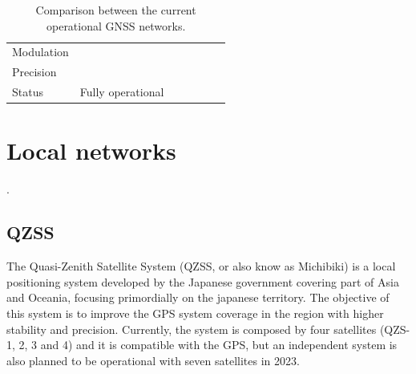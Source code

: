 \begin{table}[!h]
\begin{tabular}{lcccccc}
        Modulation                       &                   &                              &                      &                &         &  \\
        Precision                        &                   &                              &                      &                &         &  \\
        Status                           & Fully operational &                              &                      &                &         &  \\
        \bottomrule[1.5pt]
    \end{tabular}
    \caption{Comparison between the current operational GNSS networks.}
    \label{tab:networks-comparison}
\end{table}


\section{Local networks}

.

\subsection{QZSS}

The Quasi-Zenith Satellite System \cite{qzss} (QZSS, or also know as Michibiki) is a local positioning system developed by the Japanese government covering part of Asia and Oceania, focusing primordially on the japanese territory. The objective of this system is to improve the GPS system coverage in the region with higher stability and precision. Currently, the system is composed by four satellites (QZS-1, 2, 3 and 4) and it is compatible with the GPS, but an independent system is also planned to be operational with seven satellites in 2023.

